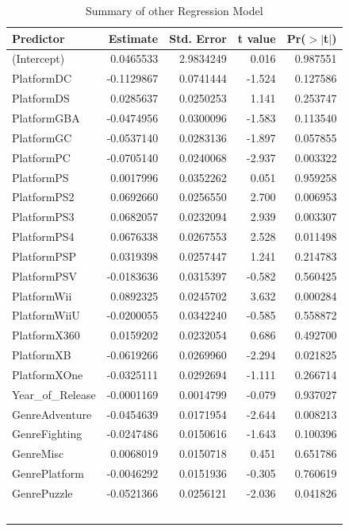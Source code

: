 \documentclass[12pt]{article}
\begin{document}
\begin{table}[ht]
  \caption{Summary of other Regression Model}
  \label{tab:other}
\centering
\begin{tabular}{lrrrr}
\hline
Predictor & Estimate & Std. Error & t value & Pr($>$$|$t$|$) \\ 
\hline
(Intercept) & 0.0465533 & 2.9834249 & 0.016 & 0.987551  \\
PlatformDC & -0.1129867 & 0.0741444 & -1.524 & 0.127586  \\
PlatformDS & 0.0285637 & 0.0250253 & 1.141 & 0.253747  \\
PlatformGBA & -0.0474956 & 0.0300096 & -1.583 & 0.113540  \\
PlatformGC & -0.0537140 & 0.0283136 & -1.897 & 0.057855   \\
PlatformPC & -0.0705140 & 0.0240068 & -2.937 & 0.003322   \\
PlatformPS & 0.0017996 & 0.0352262 & 0.051 & 0.959258  \\
PlatformPS2 & 0.0692660 & 0.0256550 & 2.700 & 0.006953   \\
PlatformPS3 & 0.0682057 & 0.0232094 & 2.939 & 0.003307   \\
PlatformPS4 & 0.0676338 & 0.0267553 & 2.528 & 0.011498   \\
PlatformPSP & 0.0319398 & 0.0257447 & 1.241 & 0.214783  \\
PlatformPSV & -0.0183636 & 0.0315397 & -0.582 & 0.560425  \\
PlatformWii & 0.0892325 & 0.0245702 & 3.632 & 0.000284   \\
PlatformWiiU & -0.0200055 & 0.0342240 & -0.585 & 0.558872  \\
PlatformX360 & 0.0159202 & 0.0232054 & 0.686 & 0.492700  \\
PlatformXB & -0.0619266 & 0.0269960 & -2.294 & 0.021825   \\
PlatformXOne & -0.0325111 & 0.0292694 & -1.111 & 0.266714  \\
Year_of_Release & -0.0001169 & 0.0014799 & -0.079 & 0.937027  \\
GenreAdventure & -0.0454639 & 0.0171954 & -2.644 & 0.008213   \\
GenreFighting & -0.0247486 & 0.0150616 & -1.643 & 0.100396  \\
GenreMisc & 0.0068019 & 0.0150718 & 0.451 & 0.651786  \\
GenrePlatform & -0.0046292 & 0.0151936 & -0.305 & 0.760619  \\
GenrePuzzle & -0.0521366 & 0.0256121 & -2.036 & 0.041826   \\
$$
\end{tabular}
\end{table}
\end{document}
